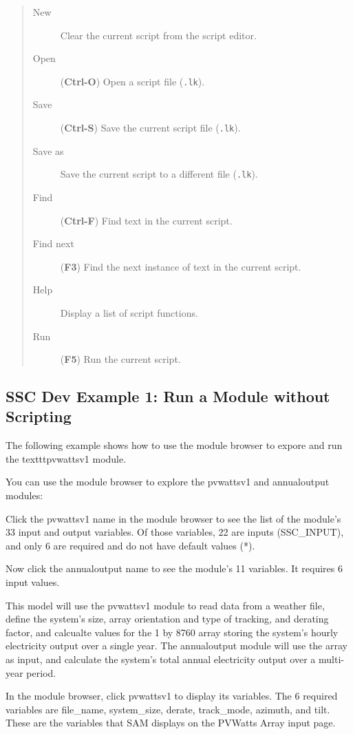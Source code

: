 \documentclass{article}
\begin{document}
\begin{quote}
\begin{description}
\item[New] Clear the current script from the script editor.
\item[Open]  (\textbf{Ctrl-O}) Open a script file (\texttt{.lk}).
\item[Save] (\textbf{Ctrl-S}) Save the current script file (\texttt{.lk}).
\item[Save as] Save the current script to a different file (\texttt{.lk}).
\item[Find] (\textbf{Ctrl-F}) Find text in the current script.
\item[Find next] (\textbf{F3}) Find the next instance of text in the current script.
\item[Help] Display a list of script functions.
\item[Run] (\textbf{F5}) Run the current script.
\end{description}
\end{quote}

\subsection{SSC Dev Example 1: Run a Module without Scripting}
\label{sec_sscdev_example_no_scripting}

The following example shows how to use the module browser to expore and run the texttt{pvwattsv1} module.

You can use the module browser to explore the pvwattsv1 and annualoutput modules:

Click the pvwattsv1 name in the module browser to see the list of the module's 33 input and output variables. Of those variables, 22 are inputs (SSC\_INPUT), and only 6 are required and do not have default values (*).

Now click the annualoutput name to see the module's 11 variables. It requires 6 input values.

This model will use the pvwattsv1 module to read data from a weather file, define the system's size, array orientation and type of tracking, and derating factor, and calcualte values for the 1 by 8760 array storing the system's hourly electricity output over a single year. The annualoutput module will use the array as input, and calculate the system's total annual electricity output over a multi-year period.

In the module browser, click pvwattsv1 to display its variables. The 6 required variables are file\_name, system\_size, derate, track\_mode, azimuth, and tilt. These are the variables that SAM displays on the PVWatts Array input page.
\end{document}
